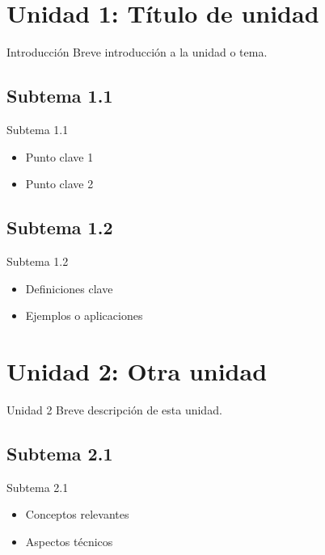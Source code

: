 \documentclass[aspectratio=169]{beamer}
\begin{document}

\section{Unidad 1: Título de unidad}
\begin{frame}{Introducción}
  Breve introducción a la unidad o tema.
\end{frame}

\subsection{Subtema 1.1}
\begin{frame}{Subtema 1.1}
  \begin{itemize}
    \item Punto clave 1
    \item Punto clave 2
  \end{itemize}
\end{frame}

\subsection{Subtema 1.2}
\begin{frame}{Subtema 1.2}
  \begin{itemize}
    \item Definiciones clave
    \item Ejemplos o aplicaciones
  \end{itemize}
\end{frame}

\section{Unidad 2: Otra unidad}
\begin{frame}{Unidad 2}
  Breve descripción de esta unidad.
\end{frame}

\subsection{Subtema 2.1}
\begin{frame}{Subtema 2.1}
  \begin{itemize}
    \item Conceptos relevantes
    \item Aspectos técnicos
  \end{itemize}
\end{frame}
\end{document}
